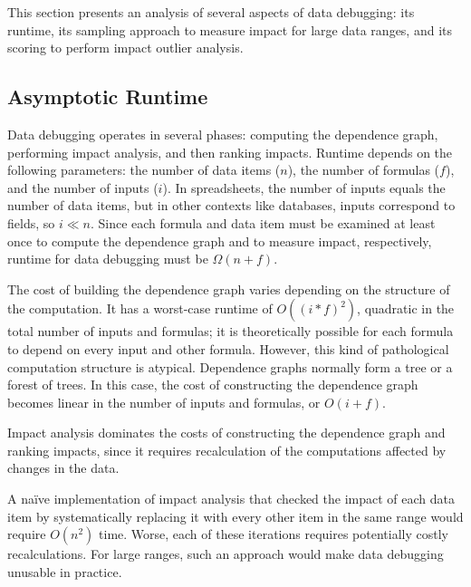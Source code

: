 
This section presents an analysis of several aspects of data
debugging: its runtime, its sampling approach to measure impact for
large data ranges, and its scoring to perform impact outlier analysis.

\subsection{Asymptotic Runtime}
\label{sec:asymptotic_analysis}

Data debugging operates in several phases: computing the dependence
graph, performing impact analysis, and then ranking impacts. Runtime
depends on the following parameters: the number of data items ($n$),
the number of formulas ($f$), and the number of inputs ($i$). In
spreadsheets, the number of inputs equals the number of data items,
but in other contexts like databases, inputs correspond to fields, so
$i \ll n$. Since each formula and data item must be examined at least
once to compute the dependence graph and to measure impact,
respectively, runtime for data debugging must be 
$\Omega(n+f)$.

The cost of building the dependence graph varies depending on the
structure of the computation. It has a worst-case runtime of
$O((i*f)^2)$, quadratic in the total number of inputs and formulas; it
is theoretically possible for each formula to depend on every input
and other formula. However, this kind of pathological computation
structure is atypical. Dependence graphs normally form a tree or a
forest of trees. In this case, the cost of constructing the dependence
graph becomes linear in the number of inputs and formulas, or
$O(i+f)$.

Impact analysis dominates the costs of constructing the dependence
graph and ranking impacts, since it requires recalculation of the
computations affected by changes in the data.

A na\"ive implementation of impact analysis that checked the impact of
each data item by systematically replacing it with every other item in
the same range would require $O(n^2)$ time. Worse, each of these
iterations requires potentially costly recalculations. For large
ranges, such an approach would make data debugging unusable in
practice.
 
